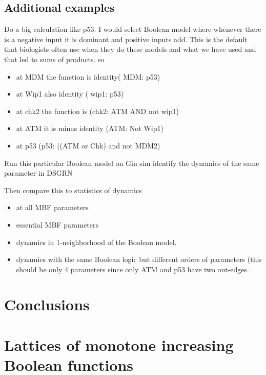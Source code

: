 \documentclass[12pt, notitlepage]{amsart}
\theoremstyle{definition}
\begin{document}
\subsection{Additional examples}
\label{sec:more_examples}
{\color{magenta}

  Do a big calculation like p53.
  I would select Boolean model where whenever there is a negative input it is dominant and positive inputs add.
  This is the default that biologists often use when they do these models and what we have used and that led to sums of products.
  so
  \begin{itemize}
    \item at MDM the function is identity( MDM: p53)
    \item at Wip1 also identity ( wip1: p53)
    \item at chk2 the function is (chk2: ATM AND not wip1)
    \item at ATM  it is minus identity  (ATM: Not Wip1)
    \item at p53  (p53: ((ATM or Chk) and not MDM2)
    \end{itemize}

    Run this particular Boolean model  on Gin sim
    identify the dynamics of the same parameter in DSGRN

    Then compare this to statistics of dynamics
    \begin{itemize}
      \item at all
        MBF parameters
      \item essential MBF parameters
      \item dynamics in  1-neighborhood of the Boolean model.
      \item dynamics with the same Boolean logic but different orders of parameters (this should be only 4 parameters since only ATM and p53 have two out-edges.
      \end{itemize}
    }

    \section{Conclusions}

    \section{Lattices of monotone increasing Boolean functions}
\end{document}

